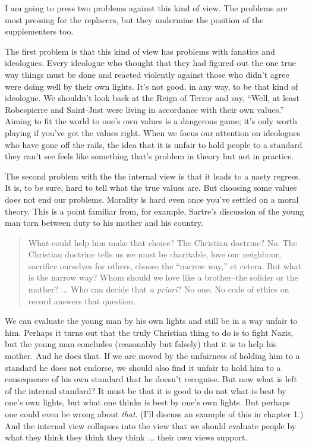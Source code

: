 I am going to press two problems against this kind of view. The problems are most pressing for the replacers, but they undermine the position of the supplementers too.

The first problem is that this kind of view has problems with fanatics and ideologues. Every ideologue who thought that they had figured out the one true way things must be done and reacted violently against those who didn't agree were doing well by their own lights. It's not good, in any way, to be that kind of ideologue. We shouldn't look back at the Reign of Terror and say, ``Well, at least \gls{Robespierre} and \gls{Saint-Just} were living in accordance with their own values.'' Aiming to fit the world to one's own values is a dangerous game; it's only worth playing if you've got the values right. When we focus our attention on ideologues who have gone off the rails, the idea that it is unfair to hold people to a standard they can't see feels like something that's problem in theory but not in practice.

The second problem with the the internal view is that it leads to a nasty regress. It is, to be sure, hard to tell what the true values are. But choosing some values does not end our problems. Morality is hard even once you've settled on a moral theory. This is a point familiar from, for example, Sartre's discussion of the young man torn between duty to his mother and his country.

\begin{quote}
What could help him make that choice? The Christian doctrine? No. The Christian doctrine tells us we must be charitable, love our neighbour, sacrifice ourselves for others, choose the ``narrow way,'' et cetera. But what is the narrow way? Whom should we love like a brother--the solider or the mother? $\dots$ Who can decide that \emph{a priori}? No one. No code of ethics on record answers that question. ~\citep[31]{Sartre1946}
\end{quote}
We can evaluate the young man by his own lights and still be in a way unfair to him. Perhaps it turns out that the truly Christian thing to do is to fight Nazis, but the young man concludes (reasonably but falsely) that it is to help his mother. And he does that. If we are moved by the unfairness of holding him to a standard he does not endorse, we should also find it unfair to hold him to a consequence of his own standard that he doesn't recognise. But now what is left of the internal standard? It must be that it is good to do not what is best by one's own lights, but what one thinks is best by one's own lights. But perhaps one could even be wrong about \emph{that}. (I'll discuss an example of this in chapter 1.) And the internal view collapses into the view that we should evaluate people by what they think they think they think $\dots$ their own views support.

